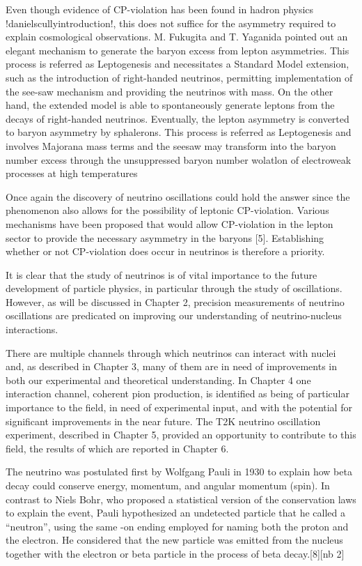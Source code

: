 Even though evidence of CP-violation has been found in hadron physics %
!danielscullyintroduction!, this does not suffice for the asymmetry required to %
explain cosmological observations.
M. Fukugita and T. Yaganida pointed out an elegant mechanism to generate the baryon excess %
from lepton asymmetries.
This process is referred as Leptogenesis and necessitates a Standard Model extension, %
such as the introduction of right-handed neutrinos, permitting implementation of %
the see-saw mechanism and providing the neutrinos with mass.
On the other hand, the extended model is able to spontaneously generate leptons %
from the decays of right-handed neutrinos.
Eventually, the lepton asymmetry is converted to baryon asymmetry by sphalerons.
This process is referred as Leptogenesis and involves Majorana mass terms and the %
seesaw may transform into the baryon number excess through the
unsuppressed baryon number wolatlon of electroweak processes at high temperatures




 Once again the discovery of neutrino oscillations could hold the answer since the phenomenon also allows for the possibility of leptonic CP-violation. Various mechanisms have been proposed that would allow CP-violation in the lepton sector to provide the necessary asymmetry in the baryons [5]. Establishing whether or not CP-violation does occur in neutrinos is therefore a priority.

 It is clear that the study of neutrinos is of vital importance to the future development of particle physics, in particular through the study of oscillations. However, as will be discussed in Chapter 2, precision measurements of neutrino oscillations are predicated on improving our understanding of neutrino-nucleus interactions.

 There are multiple channels through which neutrinos can interact with nuclei and, as described in Chapter 3, many of them are in need of improvements in both our experimental and theoretical understanding. In Chapter 4 one interaction channel, coherent pion production, is identified as being of particular importance to the field, in need of experimental input, and with the potential for significant improvements in the near future. The T2K neutrino oscillation experiment, described in Chapter 5, provided an opportunity to contribute to this field, the results of which are reported in Chapter 6. 

The neutrino was postulated first by Wolfgang Pauli in 1930 to explain %
how beta decay could conserve energy, momentum, and angular momentum (spin).
In contrast to Niels Bohr, who proposed a statistical version of the conservation %
laws to explain the event, Pauli hypothesized an undetected particle that he %
called a ``neutron'', using the same -on ending employed for naming both %
the proton and the electron.
He considered that the new particle was emitted from the nucleus together with %
the electron or beta particle in the process of beta decay.[8][nb 2]

